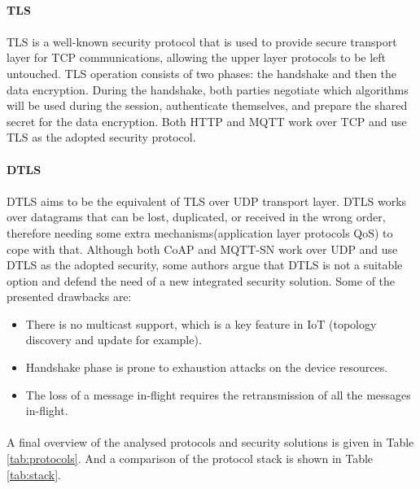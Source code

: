 \paragraph{\textbf{\ac{TLS}}}
\paragraph{}
	\ac{TLS} is a well-known security protocol that is used to provide secure transport layer for \ac{TCP} communications, allowing the upper layer protocols to be left untouched. \ac{TLS} operation consists of two phases: the handshake and then the data encryption. During the handshake, both parties negotiate which algorithms will be used during the session, authenticate themselves, and prepare the shared secret for the data encryption.
	Both \ac{HTTP} and \ac{MQTT} work over \ac{TCP} and use \ac{TLS} as the adopted security protocol.

\paragraph{\textbf{\ac{DTLS}}}
\paragraph{}
	\ac{DTLS} aims to be the equivalent of \ac{TLS} over \ac{UDP} transport layer. \ac{DTLS} works over datagrams that can be lost, duplicated, or received in the wrong order, therefore needing some extra mechanisms(application layer protocols \ac{QoS}) to cope with that. Although both \ac{CoAP} and \ac{MQTT-SN} work over \ac{UDP} and use \ac{DTLS} as the adopted security, some authors argue that \ac{DTLS} is not a suitable option \cite{Alghamdi2013} and defend the need of a new integrated security solution. Some of the presented drawbacks are:

\begin{itemize}
	\item There is no multicast support, which is a key feature in \ac{IoT} (topology discovery and update for example).
	\item Handshake phase is prone to exhaustion attacks on the device resources.
	\item The loss of a message in-flight requires the retransmission of all the messages in-flight.
\end{itemize}

\paragraph{}
	A final overview of the analysed protocols and security solutions is given in Table \ref{tab:protocols}. And a comparison of the protocol stack is shown in Table \ref{tab:stack}. 

